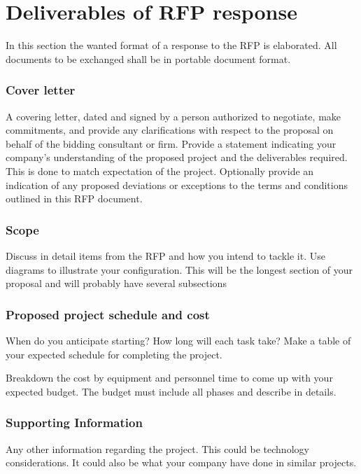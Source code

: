 \section{Deliverables of RFP response}
In this section the wanted format of a response to the RFP is elaborated. All documents to be exchanged shall be in portable document format.

\subsubsection{Cover letter}
A covering letter, dated and signed by a person authorized to negotiate, make commitments, and provide any clarifications with respect to the proposal on behalf of the bidding consultant or firm. Provide a statement indicating your company’s understanding of the proposed project and the deliverables required. This is done to match expectation of the project. Optionally provide an indication of any proposed deviations or exceptions to the terms and conditions outlined in this RFP document.

\subsubsection{Scope}
Discuss in detail items from the RFP and how you intend to tackle it. Use diagrams to illustrate your configuration. This will be the longest section of your proposal and will probably have several subsections

\subsubsection{Proposed project schedule and cost}
When do you anticipate starting? How long will each task take? Make a table of your expected schedule for completing the project.

Breakdown the cost by equipment and personnel time to come up with your expected budget. The budget must include all phases and describe in details. 

\subsubsection{Supporting Information}
Any other information regarding the project. This could be technology considerations. It could also be what your company have done in similar projects. 